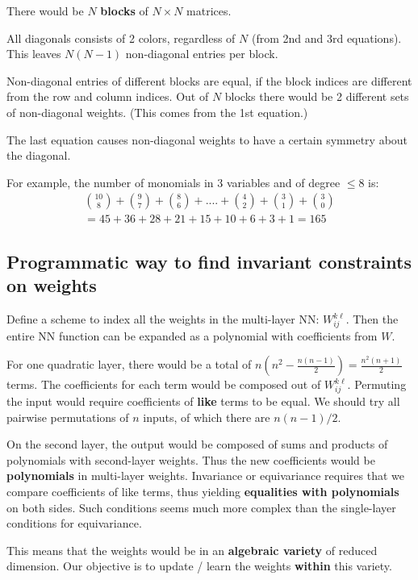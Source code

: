 There would be $N$ \textbf{blocks} of $N \times N$ matrices.

All diagonals consists of 2 colors, regardless of $N$ (from 2nd and 3rd equations).  This leaves $N (N - 1)$ non-diagonal entries per block.

Non-diagonal entries of different blocks are equal, if the block indices are different from the row and column indices.  Out of $N$ blocks there would be 2 different sets of non-diagonal weights.  (This comes from the 1st equation.)

The last equation causes non-diagonal weights to have a certain symmetry about the diagonal.  

For example, the number of monomials in 3 variables and of degree $\le 8$ is:
\begin{eqnarray}
{10\choose8} + {9\choose7} + {8\choose6} + .... + {4\choose2} + {3\choose1} + {3\choose0} \nonumber \\
= 45 + 36 + 28 + 21 + 15 + 10 + 6 + 3 + 1 = 165
\end{eqnarray}

\subsection{Programmatic way to find invariant constraints on weights}

Define a scheme to index all the weights in the multi-layer NN: $W_{ij}^{k \ell}$.  Then the entire NN function can be expanded as a polynomial with coefficients from $W$.

For one quadratic layer, there would be a total of $\displaystyle n \left( n^2 - \frac{n (n - 1)}{2} \right) = \frac{n^2 (n + 1)}{2}$ terms.  The coefficients for each term would be composed out of $W_{ij}^{k \ell}$.  Permuting the input would require coefficients of \textbf{like} terms to be equal.  We should try all pairwise permutations of $n$ inputs, of which there are $n (n - 1) / 2$.

On the second layer, the output would be composed of sums and products of polynomials with second-layer weights.  Thus the new coefficients would be \textbf{polynomials} in multi-layer weights.  Invariance or equivariance requires that we compare coefficients of like terms, thus yielding \textbf{equalities with polynomials} on both sides.  Such conditions seems much more complex than the single-layer conditions for equivariance.

This means that the weights would be in an \textbf{algebraic variety} of reduced dimension.  Our objective is to update / learn the weights \textbf{within} this variety.  

